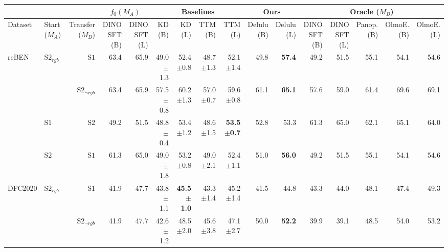 \begin{tabular}{llr | r r r r r r r r r r r r r}
\toprule
\multicolumn{3}{c}{} & \multicolumn{2}{c|}{$f_0(M_A)$} & \multicolumn{4}{c|}{Baselines} & \multicolumn{2}{c|}{Ours} & \multicolumn{5}{c}{Oracle ($M_B$)} \\
\midrule
Dataset & \shortstack[c]{Start\\($M_A$)} & \shortstack[c]{Transfer\\($M_B$)} & \shortstack[c]{DINO\\SFT (B)} & \shortstack[c]{DINO\\SFT (L)} & \shortstack[c]{KD\\(B)} & \shortstack[c]{KD\\(L)} & \shortstack[c]{TTM\\(B)} & \shortstack[c]{TTM\\(L)} & \shortstack[c]{Delulu\\(B)} & \shortstack[c]{Delulu\\(L)} & \shortstack[c]{DINO\\SFT (B)} & \shortstack[c]{DINO\\SFT (L)} & \shortstack[c]{Panop.\\(B)} & \shortstack[c]{OlmoE.\\(B)} & \shortstack[c]{OlmoE.\\(L)} \\
\midrule
  \multirow{4}{*}{reBEN} & \multirow{2}{*}{$\mathrm{S2}_{rgb}$} & $\mathrm{S1}$ & 63.4 & 65.9 & 49.0$\pm$1.3 & 52.4$\pm$0.8 & 48.7$\pm$1.3 & 52.1$\pm$1.4 & 49.8 & \textbf{57.4} & 49.2 & 51.5 & 55.1 & 54.1 & 54.6 \\
   &  & $\mathrm{S2}_{\neg rgb}$ & 63.4 & 65.9 & 57.5$\pm$0.8 & 60.2$\pm$1.3 & 57.0$\pm$0.7 & 59.6$\pm$0.8 & 61.1 & \textbf{65.1} & 57.6 & 59.0 & 61.4 & 69.6 & 69.1 \\
   & $\mathrm{S1}$ & $\mathrm{S2}$ & 49.2 & 51.5 & 48.8$\pm$0.4 & 53.4$\pm$1.2 & 48.6$\pm$1.5 & \textbf{53.5$\pm$0.7} & 52.8 & 53.3 & 61.3 & 65.0 & 62.1 & 65.1 & 64.0 \\
   & $\mathrm{S2}$ & $\mathrm{S1}$ & 61.3 & 65.0 & 49.0$\pm$1.8 & 53.2$\pm$0.8 & 49.0$\pm$2.1 & 52.4$\pm$1.1 & 51.0 & \textbf{56.0} & 49.2 & 51.5 & 55.1 & 54.1 & 54.6 \\
  \midrule
  \multirow{4}{*}{DFC2020} & \multirow{2}{*}{$\mathrm{S2}_{rgb}$} & $\mathrm{S1}$ & 41.9 & 47.7 & 43.8$\pm$1.1 & \textbf{45.5$\pm$1.0} & 43.3$\pm$1.4 & 45.2$\pm$1.4 & 41.5 & 44.8 & 43.3 & 44.0 & 48.1 & 47.4 & 49.3 \\
   &  & $\mathrm{S2}_{\neg rgb}$ & 41.9 & 47.7 & 42.6$\pm$1.2 & 48.5$\pm$2.0 & 45.6$\pm$3.8 & 47.1$\pm$2.7 & 50.0 & \textbf{52.2} & 39.9 & 39.1 & 48.5 & 54.0 & 53.2 \\

\end{tabular}
